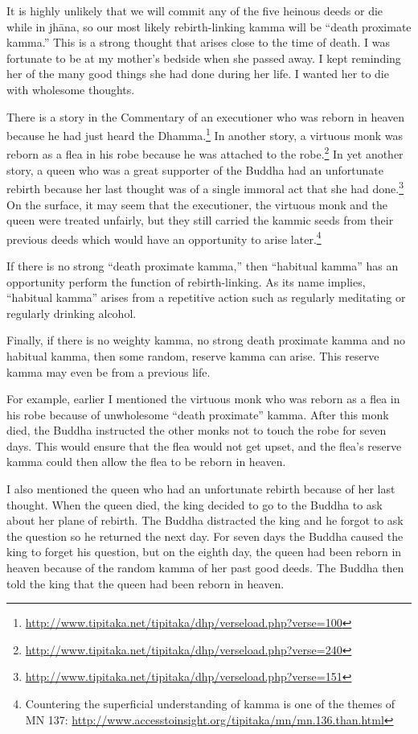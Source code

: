 \pagebreak

It is highly unlikely that we will commit any of the five heinous deeds or die while in jhāna, so our most likely rebirth-linking kamma will be “death proximate kamma.” This is a strong thought that arises close to the time of death. I was fortunate to be at my mother’s bedside when she passed away. I kept reminding her of the many good things she had done during her life. I wanted her to die with wholesome thoughts. 

There is a story in the Commentary of an executioner who was reborn in heaven because he had just heard the Dhamma.\footnote{\url{http://www.tipitaka.net/tipitaka/dhp/verseload.php?verse=100}} In another story, a virtuous monk was reborn as a flea in his robe because he was attached to the robe.\footnote{\url{http://www.tipitaka.net/tipitaka/dhp/verseload.php?verse=240}} In yet another story, a queen who was a great supporter of the Buddha had an unfortunate rebirth because her last thought was of a single immoral act that she had done.\footnote{\url{http://www.tipitaka.net/tipitaka/dhp/verseload.php?verse=151}} On the surface, it may seem that the executioner, the virtuous monk and the queen were treated unfairly, but they still carried the kammic seeds from their previous deeds which would have an opportunity to arise later.\footnote{Countering the superficial understanding of kamma is one of the themes of MN 137: \url{http://www.accesstoinsight.org/tipitaka/mn/mn.136.than.html}}

If there is no strong “death proximate kamma,” then “habitual kamma” has an opportunity perform the function of rebirth-linking. As its name implies, “habitual kamma” arises from a repetitive action such as regularly meditating or regularly drinking alcohol.

Finally, if there is no weighty kamma, no strong death proximate kamma and no habitual kamma, then some random, reserve kamma can arise. This reserve kamma may even be from a previous life. 

For example, earlier I mentioned the virtuous monk who was reborn as a flea in his robe because of unwholesome “death proximate” kamma. After this monk died, the Buddha instructed the other monks not to touch the robe for seven days. This would ensure that the flea would not get upset, and the flea’s reserve kamma could then allow the flea to be reborn in heaven. 

I also mentioned the queen who had an unfortunate rebirth because of her last thought. When the queen died, the king decided to go to the Buddha to ask about her plane of rebirth. The Buddha distracted the king and he forgot to ask the question so he returned the next day. For seven days the Buddha caused the king to forget his question, but on the eighth day, the queen had been reborn in heaven because of the random kamma of her past good deeds. The Buddha then told the king that the queen had been reborn in heaven.

